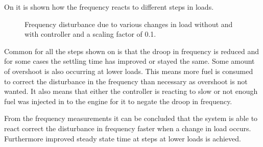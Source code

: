  On  it is shown how the frequency reacts to different steps in loads. 


\begin{figure}[H]
\centering

\caption{Frequency disturbance due to various changes in load without and with controller and a scaling factor of 0.1.}
\label{fig:test8+11freq-1020-4050-1030-1050}
\end{figure}

Common for all the steps shown on  is that the droop in frequency is reduced and for some cases the settling time has improved or stayed the same. Some amount of overshoot is also occurring at lower loads. This means more fuel is consumed to correct the disturbance in the frequency than necessary as overshoot is not wanted. It also means that either the controller is reacting to slow or not enough fuel was injected in to the engine for it to negate the droop in frequency.


From the frequency measurements it can be concluded that the system is able to react correct the disturbance in frequency faster when a change in load occurs. Furthermore improved steady state time at steps at lower loads is achieved.  


